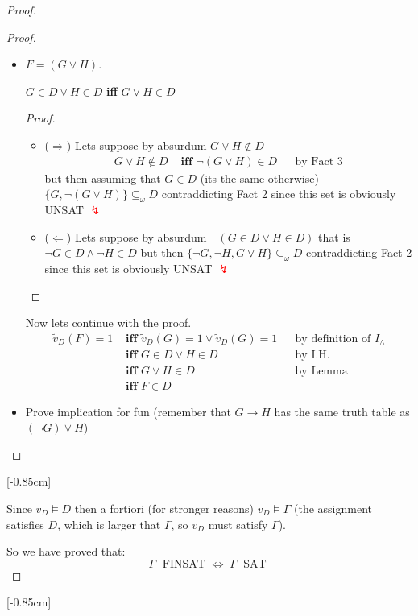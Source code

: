\begin{proof}
\begin{proof}
\begin{itemize}
				\item $F = (G \vee H)$.
				  \begin{lemma*} $G \in D \vee H \in D$ \textbf{ iff } $G \vee H \in D$ \end{lemma*}
				  \begin{proof} \hspace{2cm}
					\begin{itemize}
					  \item ($\Rightarrow$) Lets suppose by absurdum $G \vee H \notin D$
						\begin{align*}
						  G \vee H \notin D &\textbf{ iff } \neg(G \vee H) \in D && \text{by Fact 3}
						\end{align*}
						but then assuming that $G \in D$ (its the same otherwise)  $\{G, \neg(G \vee H)\} \subseteq_\omega D$ contraddicting Fact 2 since this set is obviously UNSAT \textcolor{red}{$\lightning$}
						\item ($\Leftarrow$) Lets suppose by absurdum $\neg(G \in D \vee H \in D)$ that is $ \neg G \in D \wedge \neg H \in D$ but then $ \{\neg G, \neg H, G \vee H\} \subseteq_\omega D$ contraddicting Fact 2 since this set is obviously UNSAT \textcolor{red}{$\lightning$}
					\end{itemize}
				\end{proof}
				\vspace{-0.5cm}
				Now lets continue with the proof.
				\begin{align*}
				  \tilde{v}_D (F) = 1 &\textbf{ iff } \tilde{v}_D (G) = 1 \vee \tilde{v}_D (G) = 1  && \text{by definition of $I_\wedge$} \\
				  &\textbf{ iff } G \in D \vee H \in D  && \text{by I.H.} \\
				  &\textbf{ iff } G \vee H \in D && \text{by Lemma} \\
				  &\textbf{ iff } F \in D &&
				\end{align*}

				\item Prove implication for fun (remember that $G \rightarrow H$ has the same truth table as $(\neg G) \vee H$)
			\end{itemize}
		\end{proof}
		[-0.85cm]

		Since $v_D \models D$ then a fortiori (for stronger reasons) $v_D \models \Gamma$ (the assignment satisfies $D$, which is larger that $\Gamma$, so $v_D$ must satisfy $\Gamma$).

		So we have proved that:
		$$ \Gamma \; \text{ FINSAT } \Leftrightarrow \; \Gamma \; \text{ SAT } $$
	\end{proof}
	[-0.85cm]

